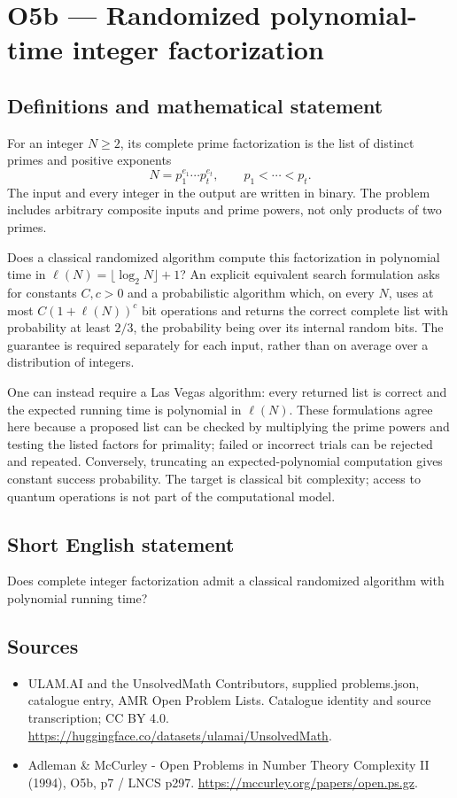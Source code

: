 \documentclass[11pt,a4paper]{article}
\begin{document}
\section*{O5b — Randomized polynomial-time integer factorization}\label{statement}

\subsection{Definitions and mathematical statement}
For an integer $N\ge2$, its complete prime factorization is the list of distinct primes and positive exponents
\[
N=p_1^{e_1}\cdots p_t^{e_t},\qquad p_1<\cdots<p_t.
\]
The input and every integer in the output are written in binary. The problem includes arbitrary composite inputs and prime powers, not only products of two primes.

Does a classical randomized algorithm compute this factorization in polynomial time in $\ell(N)=\lfloor\log_2N\rfloor+1$? An explicit equivalent search formulation asks for constants $C,c>0$ and a probabilistic algorithm which, on every $N$, uses at most $C(1+\ell(N))^c$ bit operations and returns the correct complete list with probability at least $2/3$, the probability being over its internal random bits. The guarantee is required separately for each input, rather than on average over a distribution of integers.

One can instead require a Las Vegas algorithm: every returned list is correct and the expected running time is polynomial in $\ell(N)$. These formulations agree here because a proposed list can be checked by multiplying the prime powers and testing the listed factors for primality; failed or incorrect trials can be rejected and repeated. Conversely, truncating an expected-polynomial computation gives constant success probability. The target is classical bit complexity; access to quantum operations is not part of the computational model.
\subsection{Short English statement}
Does complete integer factorization admit a classical randomized algorithm with polynomial running time?
\subsection{Sources}
\begin{itemize}
\item[S1] ULAM.AI and the UnsolvedMath Contributors, supplied problems.json, catalogue entry, AMR Open Problem Lists. Catalogue identity and source transcription; CC BY 4.0.
\url{https://huggingface.co/datasets/ulamai/UnsolvedMath}.
\item[S2] Adleman \& McCurley - Open Problems in Number Theory Complexity II (1994), O5b, p7 / LNCS p297. 
\url{https://mccurley.org/papers/open.ps.gz}.
\end{itemize}
\end{document}
